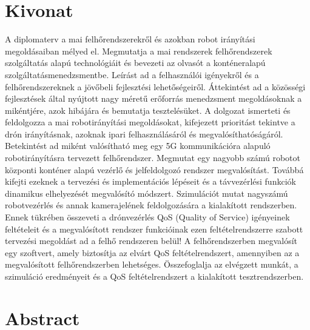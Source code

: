 
\selecthungarian

\chapter*{Kivonat}

A diplomaterv a mai felhőrendszerekről és azokban robot irányítási megoldásaiban mélyed el.
Megmutatja a mai rendszerek felhőrendszerek szolgáltatás alapú technológiáit és bevezeti az olvasót a konténeralapú szolgáltatásmenedzsmentbe. Leírást ad a felhasználói igényekről és a felhőrendszereknek a jövőbeli fejlesztési lehetőségeiről. Áttekintést ad a közösségi fejlesztések által nyújtott nagy méretű erőforrás menedzsment megoldásoknak a mikéntjére, azok hibájára és bemutatja tesztelésüket. A dolgozat ismerteti és feldolgozza a mai robotirányítási megoldásokat, kifejezett prioritást tekintve a drón irányításnak, azoknak ipari felhasználásáról és megvalósíthatóságáról. Betekintést ad miként valósítható meg egy 5G kommunikációra alapuló robotirányításra tervezett felhőrendszer. Megmutat egy nagyobb számú robotot központi konténer alapú vezérlő és jelfeldolgozó rendszer megvalósítást. Továbbá kifejti ezeknek a tervezési és implementációs lépéseit és a távvezérlési funkciók dinamikus elhelyezését megvalósító módszert. Szimulációt mutat nagyszámú robotvezérlés és annak kamerajelének feldolgozására a kialakított rendszerben. Ennek tükrében összeveti a drónvezérlés QoS (Quality of Service) igényeinek feltételeit és a megvalósított rendszer funkcióinak ezen feltételrendszerre szabott tervezési megoldást ad a felhő rendszeren belül! A felhőrendszerben megvalósít egy szoftvert, amely biztosítja az elvárt QoS feltételrendszert, amennyiben az a megvalósított felhőrendszerben lehetséges. Összefoglalja az elvégzett munkát, a szimuláció eredményeit és a QoS feltételrendszert a kialakított tesztrendszerben.


\vfill
\selectenglish


\chapter*{Abstract}

